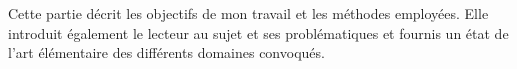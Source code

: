Cette partie décrit les objectifs de mon travail et les méthodes employées.
Elle introduit également le lecteur au sujet et ses problématiques et fournis un état de l'art élémentaire des différents domaines convoqués.